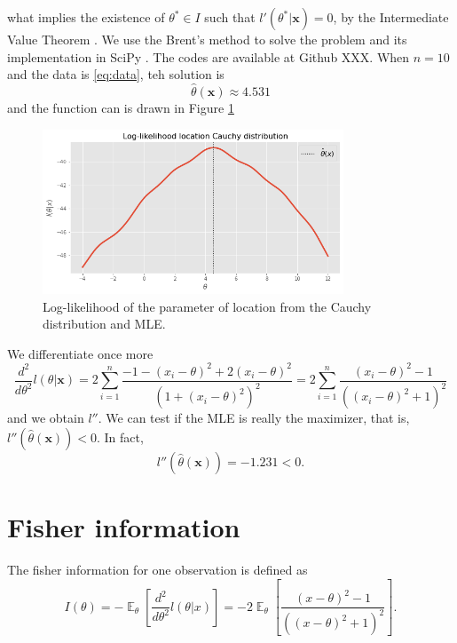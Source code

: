 \documentclass[a4paper,10pt, notitlepage]{report}
\theoremstyle{plain}
\newcommand{\ev}{\operatorname{\mathbb{E}}}
\newcommand{\bx}{\boldsymbol{x}} %
\begin{document}
    what implies the existence of $\theta^* \in I$ such that $l'(\theta^*|\bx)
    = 0$, by the Intermediate Value Theorem \cite[Theorem 12, Page 184]{Lages1976}. We use the Brent’s method \cite{brent} to solve the problem and its
    implementation in SciPy \cite{2020SciPy-NMeth}. The codes are available at
    Github XXX. When $n=10$ and the data is \ref{eq:data}, teh solution is
    $$
    \hat{\theta}(\bx) \approx 4.531
    $$
    and the function can is drawn in Figure \ref{fig:log-likelihood-cauchy}
    \begin{figure}[!hb]
        \centering
        \includegraphics[width=0.8\textwidth]{../../images/log-likelihood.png}
        \caption{Log-likelihood of the parameter of location from the Cauchy distribution and MLE.}
        \label{fig:log-likelihood-cauchy}
    \end{figure}
    
    
    We differentiate once more 
    \begin{equation}
        \label{eq:dderivarive-log-cauchy}
        \frac{d^2}{d\theta^2}l(\theta|\bx) = 2\sum_{i=1}^{n} \frac{- 1 - (x_i - \theta)^2 + 2(x_i-\theta)^2}{(1 + (x_i - \theta)^2)^2} = 2\sum_{i=1}^{n} \frac{(x_i - \theta)^2-1}{( (x_i - \theta)^2+1)^2}
    \end{equation}
    and we obtain $l''$. We can test if the MLE is really the maximizer, that is,
    $l''\left(\hat{\theta}(\bx)\right) < 0$. In fact,
    $$
    l''\left(\hat{\theta}(\bx)\right) = -1.231 < 0.
    $$

\section*{Fisher information}

The fisher information for one observation is defined as
\begin{equation}
    \label{eq:fisher-info}
    I(\theta) = -\ev_{\theta}\left[\frac{d^2}{d\theta^2}l(\theta|x)\right] = -2\ev_{\theta}\left[\frac{(x - \theta)^2 - 1}{((x - \theta)^2 + 1)^2}\right].
\end{equation}
\end{document}
